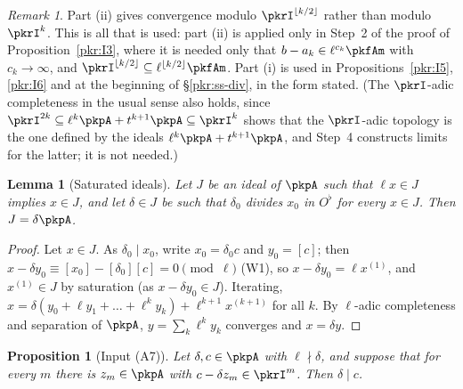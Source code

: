 \documentclass[10pt]{amsart}
\newtheorem{proposition}[theorem]{Proposition}
\newtheorem{lemma}[theorem]{Lemma}
\theoremstyle{definition}
\theoremstyle{remark}
\newtheorem{remark}[theorem]{Remark}
\begin{document}
\begin{remark}\label{pkr:rem-complete}
Part (ii) gives convergence modulo $\pkrI^{\lfloor k/2\rfloor}$ rather than modulo $\pkrI^k$. This is all
that is used: part (ii) is applied only in Step~2 of the proof of Proposition~\ref{pkr:I3}, where it is
needed only that $b-a_k\in\ell^{c_k}\pkfAm$ with $c_k\to\infty$, and $\pkrI^{\lfloor k/2\rfloor}\subseteq
\ell^{\lfloor k/2\rfloor}\pkfAm$. Part (i) is used in Propositions~\ref{pkr:I5}, \ref{pkr:I6} and at the
beginning of \S\ref{pkr:ss-div}, in the form stated. (The $\pkrI$-adic completeness in the usual sense
also holds, since $\pkrI^{2k}\subseteq\ell^k\pkpA+t^{k+1}\pkpA\subseteq\pkrI^k$ shows that the
$\pkrI$-adic topology is the one defined by the ideals $\ell^k\pkpA+t^{k+1}\pkpA$, and Step~4 constructs
limits for the latter; it is not needed.)
\end{remark}

\begin{lemma}[Saturated ideals]\label{pkr:sat}
Let $J$ be an ideal of $\pkpA$ such that $\ell x\in J$ implies $x\in J$, and let $\delta\in J$ be such
that $\delta_0$ divides $x_0$ in $O^\flat$ for every $x\in J$. Then $J=\delta\pkpA$.
\end{lemma}

\begin{proof}
Let $x\in J$. As $\delta_0\mid x_0$, write $x_0=\delta_0c$ and $y_0=[c]$; then $x-\delta y_0\equiv
[x_0]-[\delta_0][c]=0\pmod{\ell}$ (W1), so $x-\delta y_0=\ell x^{(1)}$, and $x^{(1)}\in J$ by saturation
(as $x-\delta y_0\in J$). Iterating, $x=\delta(y_0+\ell y_1+\dots+\ell^ky_k)+\ell^{k+1}x^{(k+1)}$ for all
$k$. By $\ell$-adic completeness and separation of $\pkpA$, $y=\sum_k\ell^ky_k$ converges and $x=\delta
y$.
\end{proof}

\begin{proposition}[Input (A7)]\label{pkr:I7}
Let $\delta,c\in\pkpA$ with $\ell\nmid\delta$, and suppose that for every $m$ there is $z_m\in\pkpA$
with $c-\delta z_m\in\pkrI^m$. Then $\delta\mid c$.
\end{proposition}
\end{document}
